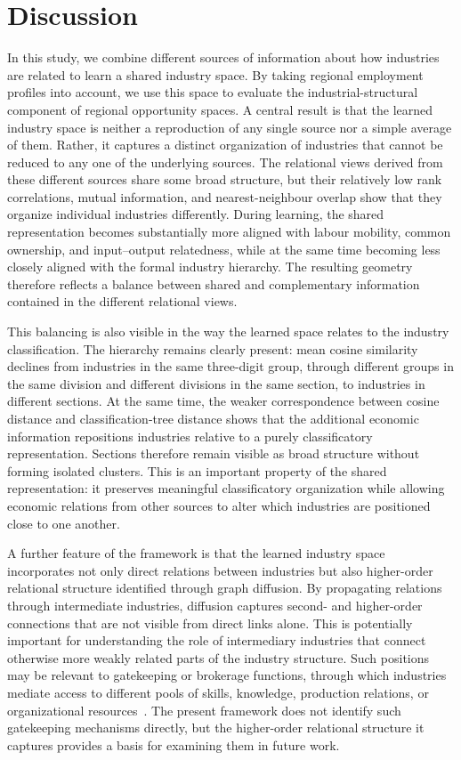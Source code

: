 \documentclass[9pt,twocolumn,twoside]{pnas-new}
\begin{document}
\section{Discussion}
In this study, we combine different sources of information about how industries are related to learn a shared industry space. By taking regional employment profiles into account, we use this space to evaluate the industrial-structural component of regional opportunity spaces. A central result is that the learned industry space is neither a reproduction of any single source nor a simple average of them. Rather, it captures a distinct organization of industries that cannot be reduced to any one of the underlying sources. The relational views derived from these different sources share some broad structure, but their relatively low rank correlations, mutual information, and nearest-neighbour overlap show that they organize individual industries differently. During learning, the shared representation becomes substantially more aligned with labour mobility, common ownership, and input--output relatedness, while at the same time becoming less closely aligned with the formal industry hierarchy. The resulting geometry therefore reflects a balance between shared and complementary information contained in the different relational views.

This balancing is also visible in the way the learned space relates to the industry classification. The hierarchy remains clearly present: mean cosine similarity declines from industries in the same three-digit group, through different groups in the same division and different divisions in the same section, to industries in different sections. At the same time, the weaker correspondence between cosine distance and classification-tree distance shows that the additional economic information repositions industries relative to a purely classificatory representation. Sections therefore remain visible as broad structure without forming isolated clusters. This is an important property of the shared representation: it preserves meaningful classificatory organization while allowing economic relations from other sources to alter which industries are positioned close to one another.

A further feature of the framework is that the learned industry space incorporates not only direct relations between industries but also higher-order relational structure identified through graph diffusion. By propagating relations through intermediate industries, diffusion captures second- and higher-order connections that are not visible from direct links alone. This is potentially important for understanding the role of intermediary industries that connect otherwise more weakly related parts of the industry structure. Such positions may be relevant to gatekeeping or brokerage functions, through which industries mediate access to different pools of skills, knowledge, production relations, or organizational resources~\cite{broekelCriticalLinksKnowledge2018}. The present framework does not identify such gatekeeping mechanisms directly, but the higher-order relational structure it captures provides a basis for examining them in future work.
\end{document}
